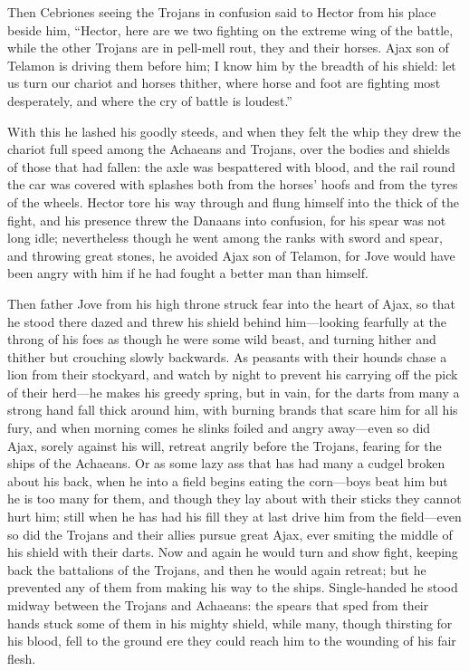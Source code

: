 Then Cebriones seeing the Trojans in confusion said to Hector from his
place beside him, “Hector, here are we two fighting on the extreme wing of
the battle, while the other Trojans are in pell-mell rout, they and their
horses. Ajax son of Telamon is driving them before him; I know him by the
breadth of his shield: let us turn our chariot and horses thither, where
horse and foot are fighting most desperately, and where the cry of battle
is loudest.”

With this he lashed his goodly steeds, and when they felt the whip they
drew the chariot full speed among the Achaeans and Trojans, over the
bodies and shields of those that had fallen: the axle was bespattered with
blood, and the rail round the car was covered with splashes both from the
horses’ hoofs and from the tyres of the wheels. Hector tore his way
through and flung himself into the thick of the fight, and his presence
threw the Danaans into confusion, for his spear was not long idle;
nevertheless though he went among the ranks with sword and spear, and
throwing great stones, he avoided Ajax son of Telamon, for Jove would have
been angry with him if he had fought a better man than himself.

Then father Jove from his high throne struck fear into the heart of Ajax,
so that he stood there dazed and threw his shield behind him—looking
fearfully at the throng of his foes as though he were some wild beast, and
turning hither and thither but crouching slowly backwards. As peasants
with their hounds chase a lion from their stockyard, and watch by night to
prevent his carrying off the pick of their herd—he makes his greedy
spring, but in vain, for the darts from many a strong hand fall thick
around him, with burning brands that scare him for all his fury, and when
morning comes he slinks foiled and angry away—even so did Ajax,
sorely against his will, retreat angrily before the Trojans, fearing for
the ships of the Achaeans. Or as some lazy ass that has had many a cudgel
broken about his back, when he into a field begins eating the corn—boys
beat him but he is too many for them, and though they lay about with their
sticks they cannot hurt him; still when he has had his fill they at last
drive him from the field—even so did the Trojans and their allies
pursue great Ajax, ever smiting the middle of his shield with their darts.
Now and again he would turn and show fight, keeping back the battalions of
the Trojans, and then he would again retreat; but he prevented any of them
from making his way to the ships. Single-handed he stood midway between
the Trojans and Achaeans: the spears that sped from their hands stuck some
of them in his mighty shield, while many, though thirsting for his blood,
fell to the ground ere they could reach him to the wounding of his fair
flesh.

